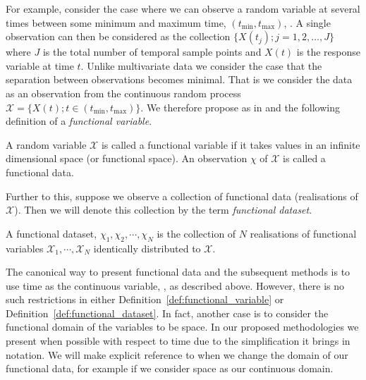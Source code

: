For example, \citeauthor{ferraty_nonparametric_2006} consider the case where we can observe a random variable at several times between some minimum and maximum time, $\left( t_{\text{min}}, t_{\text{max}} \right)$, \citep{ferraty_nonparametric_2006}.
A single observation can then be considered as the collection $ \{ X(t_j) ; j=1,2,\dots, J\}$ where $J$ is the total number of temporal sample points and $X(t)$ is the response variable at time $t$.
Unlike multivariate data we consider the case that the separation between observations becomes minimal.
That is we consider the data as an observation from the continuous random process $\mathcal{X} = \{X(t); t \in \left( t_\text{min}, t_\text{max} \right)\}$.
We therefore propose as in \citep{ferraty_nonparametric_2006} and \citep{shi_gaussian_2011} the following definition of a \textit{functional variable}.

 \begin{definition}
	A random variable $\mathcal{X}$ is called a functional variable if it takes values in an infinite dimensional space (or functional space). An observation $\chi$ of $\mathcal{X}$ is called a functional data.
	\label{def:functional_variable}
\end{definition}

Further to this, suppose we observe a collection of functional data (realisations of $\mathcal{X}$).
Then we will denote this collection by the term \textit{functional dataset}.

\begin{definition}
	A functional dataset, $\chi_1, \chi_2, \cdots, \chi_N$ is the collection of $N$ realisations of functional variables $\mathcal{X}_1, \cdots, \mathcal{X}_N$ identically distributed to $\mathcal{X}$.
	\label{def:functional_dataset}
\end{definition}

The canonical way to present functional data and the subsequent methods is to use time as the continuous variable, \cite{ramsay_functional_2010, ferraty_nonparametric_2006, shi_gaussian_2011}, as described above.
However, there is no such restrictions in either Definition~\ref{def:functional_variable} or Definition~\ref{def:functional_dataset}. 
In fact, another case is to consider the functional domain of the variables to be space.
In our proposed methodologies we present when possible with respect to time due to the simplification it brings in notation.
We will make explicit reference to when we change the domain of our functional data, for example if we consider space as our continuous domain. 


